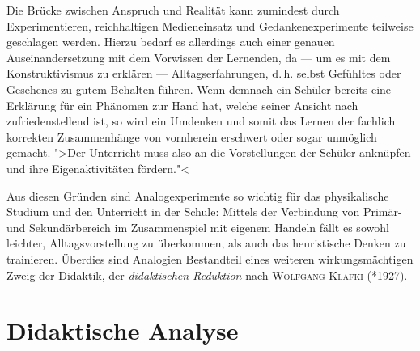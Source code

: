 Die Brücke zwischen Anspruch und Realität kann zumindest durch Experimentieren, reichhaltigen Medieneinsatz und Gedankenexperimente teilweise geschlagen werden. Hierzu bedarf es allerdings auch einer genauen Auseinandersetzung mit dem Vorwissen der Lernenden, da --- um es mit dem Konstruktivismus zu erklären --- Alltagserfahrungen, d.\,h. selbst Gefühltes oder Gesehenes zu gutem Behalten führen. Wenn demnach ein Schüler bereits eine Erklärung für ein Phänomen zur Hand hat, welche seiner Ansicht nach zufriedenstellend ist, so wird ein Umdenken und somit das Lernen der fachlich korrekten Zusammenhänge von vornherein erschwert oder sogar unmöglich gemacht. ">Der Unterricht muss also an die Vorstellungen der Schüler anknüpfen und ihre Eigenaktivitäten fördern."<  

Aus diesen Gründen sind Analogexperimente so wichtig für das physikalische Studium und den Unterricht in der Schule: Mittels der Verbindung von Primär- und Sekundärbereich im Zusammenspiel mit eigenem Handeln fällt es sowohl leichter, Alltagsvorstellung zu überkommen, als auch das heuristische Denken zu trainieren. Überdies sind Analogien Bestandteil eines weiteren wirkungsmächtigen Zweig der Didaktik, der \textit{didaktischen Reduktion} nach \textsc{Wolfgang Klafki} (*1927).

\section{Didaktische Analyse}

